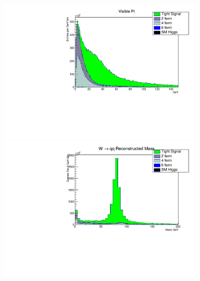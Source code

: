 \begin{figure}
	\label{fig:stacks2}
 \centering
    \begin{minipage}{0.49\textwidth}
        \centering
        \includegraphics[width=0.9\textwidth]{PtvisHist.pdf} %
   
    \end{minipage}\hfill
    \begin{minipage}{0.49\textwidth}
        \centering
        \includegraphics[width=0.9\textwidth]{mwhadHist.pdf} %
     
     \end{minipage}\\


\end{figure}
